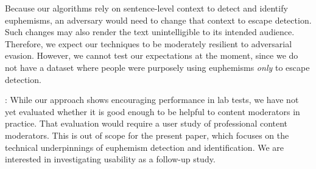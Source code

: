 Because our algorithms rely on sentence-level context
to detect and identify euphemisms,
an adversary would need to change that context
to escape detection.
Such changes 
may also render the text unintelligible
to its intended audience.
Therefore, we expect our techniques
to be moderately resilient to adversarial evasion.
However, we cannot test our expectations at the moment,
since we do not have a dataset
where people were purposely using euphemisms
\emph{only} to escape detection.

\medskip
{}:
While our approach shows encouraging performance in lab tests,
we have not yet evaluated
whether it is good enough to be helpful to content moderators in practice.
That evaluation would require a user study of professional content moderators.
This is out of scope for the present paper,
which  focuses on the technical underpinnings
of euphemism detection and identification.
We are interested in investigating usability as a follow-up study.













